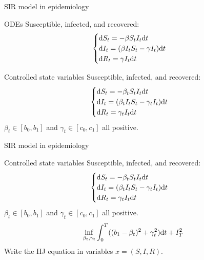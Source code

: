 \documentclass[color=usenames,dvipsnames]{beamer}
\newcommand{\dd}{\text{\normalfont d}}
\newcommand{\dt}{\text{\normalfont d}t}
\begin{document}
\begin{frame}{SIR model in epidemiology}
    \begin{block}
        {ODEs}
        Susceptible, infected, and recovered:
        \[
        \begin{cases}
            \dd{S}_t=-\beta S_t I_t \dt\\
            \dd{I}_t = (\beta I_t S_t - \gamma I_t)\dt\\
            \dd{R}_t= \gamma I_t \dt
        \end{cases}
        \]
    \end{block}
    \begin{block}
        {Controlled state variables}
        Susceptible, infected, and recovered:
        \[
        \begin{cases}
            \dd{S}_t=-\beta_t S_t I_t \dt\\
            \dd{I}_t = (\beta_t I_t S_t - \gamma_t I_t)\dt\\
            \dd{R}_t= \gamma_t I_t \dt
        \end{cases}
        \]
        $\beta_t\in[b_0,b_1]$ and $\gamma_t\in[c_0,c_1]$ all positive.
    \end{block}
\end{frame}




\begin{frame}{SIR model in epidemiology}
    \begin{block}
        {Controlled state variables}
        Susceptible, infected, and recovered:
        \[
        \begin{cases}
            \dd{S}_t=-\beta_t S_t I_t \dt\\
            \dd{I}_t = (\beta_t I_t S_t - \gamma_t I_t)\dt\\
            \dd{R}_t= \gamma_t I_t \dt
        \end{cases}
        \]
        $\beta_t\in[b_0,b_1]$ and $\gamma_t\in[c_0,c_1]$ all positive.
    \[
    \inf_{\beta_t,\gamma_t}\int_0^T ((b_1-\beta_t)^2+\gamma_t^2)\dt + I^2_T
    \]
    Write the HJ equation in variables $x=(S,I,R)$.
    \end{block}
\end{frame}
\end{document}
